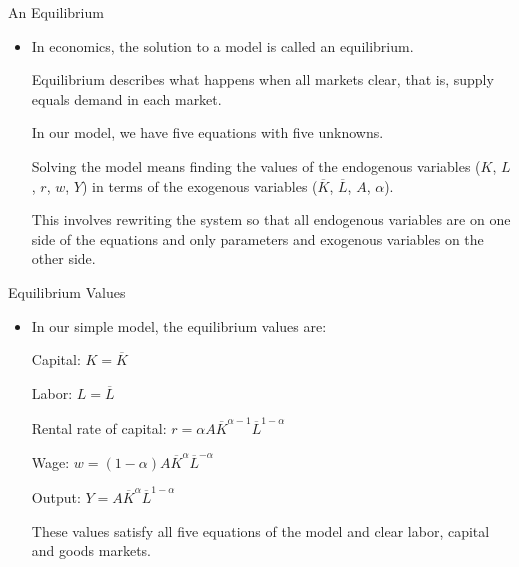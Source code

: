\documentclass[10pt,aspectratio=169]{beamer}
\begin{document}
\begin{frame}{An Equilibrium}

\begin{itemize}

\item In economics, the solution to a model is called an equilibrium. 

\itemvso Equilibrium describes what happens when all markets clear, that is, supply equals demand in each market. 

\itemvso In our model, we have five equations with five unknowns. 

\itemvso Solving the model means finding the values of the endogenous variables ($K$, $L$, $r$, $w$, $Y$) in terms of the exogenous variables ($\overline{K}$, $\overline{L}$, $A$, $\alpha$). 

\itemvso This involves rewriting the system so that all endogenous variables are on one side of the equations and only parameters and exogenous variables on the other side.

\end{itemize}

\end{frame}

\begin{frame}{Equilibrium Values}

\begin{itemize}

\item In our simple model, the equilibrium values are:

\itemvso Capital: $K = \overline{K}$

\itemvso Labor: $L = \overline{L}$

\itemvso Rental rate of capital: $r = \alpha A \overline{K}^{\alpha-1} \overline{L}^{1-\alpha}$

\itemvso Wage: $w = (1-\alpha) A \overline{K}^\alpha \overline{L}^{-\alpha}$

\itemvso Output: $Y = A \overline{K}^\alpha \overline{L}^{1-\alpha}$

\itemvso These values satisfy all five equations of the model and clear labor, capital and goods markets.

\end{itemize}

\end{frame}
\end{document}
